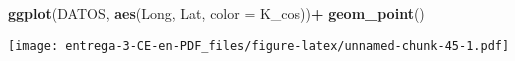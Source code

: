 \documentclass[
]{article}
\newenvironment{Shaded}{\begin{snugshade}}{\end{snugshade}}
\newcommand{\DataTypeTok}[1]{\textcolor[rgb]{0.13,0.29,0.53}{#1}}
\newcommand{\DecValTok}[1]{\textcolor[rgb]{0.00,0.00,0.81}{#1}}
\newcommand{\KeywordTok}[1]{\textcolor[rgb]{0.13,0.29,0.53}{\textbf{#1}}}
\newcommand{\NormalTok}[1]{#1}
\newcommand{\OperatorTok}[1]{\textcolor[rgb]{0.81,0.36,0.00}{\textbf{#1}}}
\newcommand{\StringTok}[1]{\textcolor[rgb]{0.31,0.60,0.02}{#1}}
\begin{document}
\begin{Shaded}
\begin{Highlighting}[]
\KeywordTok{ggplot}\NormalTok{(DATOS, }\KeywordTok{aes}\NormalTok{(Long, Lat, }\DataTypeTok{color =}\NormalTok{ K_cos))}\OperatorTok{+}
\StringTok{  }\KeywordTok{geom_point}\NormalTok{()}
\end{Highlighting}
\end{Shaded}

\texttt{[image: entrega-3-CE-en-PDF\_files/figure-latex/unnamed-chunk-45-1.pdf]}

\begin{Shaded}
\end{Shaded}
\end{document}
